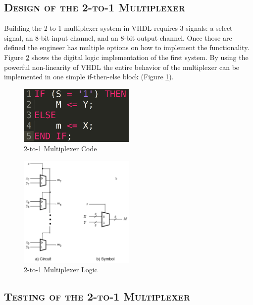 \documentclass[11pt]{report}
\begin{document}
\begin{spacing}{1.5}
\subsection{\scshape Design of the 2-to-1 Multiplexer}
\label{sub:design_2to1}

Building the 2-to-1 multiplexer system in VHDL requires 3 signals: a select signal, an 8-bit input channel, and an 8-bit output channel.  Once those are defined the engineer has multiple options on how to implement the functionality. Figure \ref{fig:logic_2to1} shows the digital logic implementation of the first system.  By using the powerful non-linearity of VHDL the entire behavior of the multiplexer can be implemented in one simple if-then-else block (Figure \ref{fig:code_2to1}).

\vspace{30px}
\begin{figure}[H]
    \centering
    \includegraphics[width=0.5\textwidth]{2to1Code}
    \caption{2-to-1 Multiplexer Code\cite{Synth}}
    \label{fig:code_2to1}
\end{figure}

\begin{figure}[H]
    \centering
    \includegraphics[width=0.5\textwidth]{2to1Multi}
    \caption{2-to-1 Multiplexer Logic}
    \label{fig:logic_2to1}
\end{figure}

\subsection{\scshape Testing of the 2-to-1 Multiplexer}
\label{sec:test_2to1}


\end{spacing}
\end{document}
